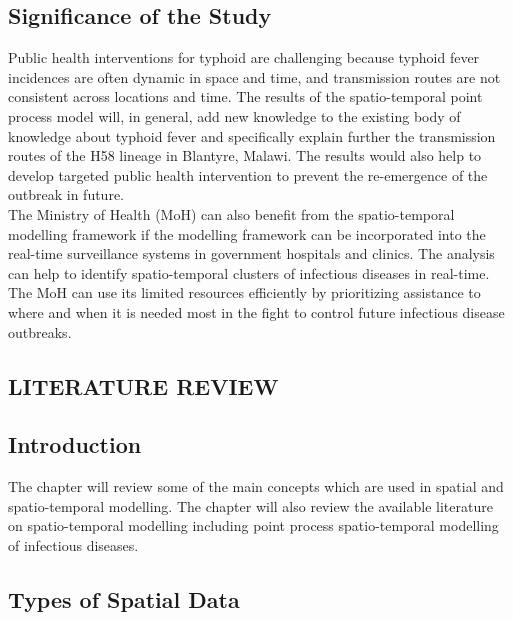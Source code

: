 \documentclass[12pt,a4paper]{report}
\begin{document}
\section{Significance of the Study}

Public health interventions for typhoid are challenging because typhoid fever incidences are often dynamic in space and time, and transmission routes are not consistent across locations and time. The results of the spatio-temporal point process model will, in general, add new knowledge to the existing body of knowledge about typhoid fever and specifically explain further the transmission routes of the H58 lineage in Blantyre, Malawi. The results would also help to develop targeted public health intervention to prevent the re-emergence of the outbreak in future.\\

The Ministry of Health (MoH) can also benefit from the spatio-temporal modelling framework if the modelling framework can be incorporated into the real-time surveillance systems in government hospitals and clinics. The analysis can help to identify spatio-temporal clusters of infectious diseases in real-time. The MoH can use its limited resources efficiently by prioritizing assistance to where and when it is needed most in the fight to control future infectious disease outbreaks.

\begin{center}
\chapter{LITERATURE REVIEW}
\end{center} 

\section{Introduction}

The chapter will review some of the main concepts which are used in spatial and spatio-temporal modelling. The chapter will also review the available literature on spatio-temporal modelling including point process spatio-temporal modelling of infectious diseases.

\section{Types of Spatial Data}
\end{document}
